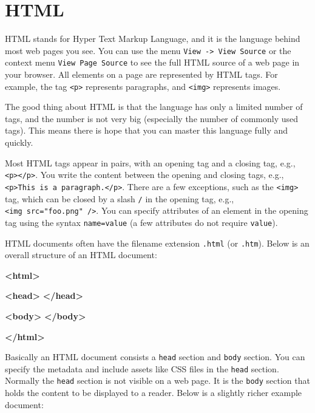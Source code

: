 \documentclass[12pt,]{krantz}
\makeatletter
\newenvironment{Shaded}{\begin{snugshade}}{\end{snugshade}}
\newcommand{\KeywordTok}[1]{\textcolor[rgb]{0.13,0.29,0.53}{\textbf{#1}}}
\newenvironment{kframe}{%
\medskip{}
\setlength{\fboxsep}{.8em}
 \def\at@end@of@kframe{}%
 \ifinner\ifhmode%
  \def\at@end@of@kframe{\end{minipage}}%
  \begin{minipage}{\columnwidth}%
 \fi\fi%
 \def\FrameCommand##1{\hskip\@totalleftmargin \hskip-\fboxsep
 \colorbox{shadecolor}{##1}\hskip-\fboxsep
     \hskip-\linewidth \hskip-\@totalleftmargin \hskip\columnwidth}%
 \MakeFramed {\advance\hsize-\width
   \@totalleftmargin\z@ \linewidth\hsize
   \@setminipage}}%
 {\par\unskip\endMakeFramed%
 \at@end@of@kframe}
\renewenvironment{Shaded}{\begin{kframe}}{\end{kframe}}
\theoremstyle{definition}
\theoremstyle{definition}
\theoremstyle{definition}
\theoremstyle{remark}
\makeatother
\begin{document}
\section{HTML}\label{html}

HTML stands for Hyper Text Markup Language, and it is the
language behind most web pages you see. You can use the menu
\texttt{View\ -\textgreater{}\ View\ Source} or the context menu
\texttt{View\ Page\ Source} to see the full HTML source of a web page in
your browser. All elements on a page are represented by HTML tags. For
example, the tag \texttt{\textless{}p\textgreater{}} represents
paragraphs, and \texttt{\textless{}img\textgreater{}} represents images.

The good thing about HTML is that the language has only a limited number
of tags, and the number is not very big (especially the number of
commonly used tags). This means there is hope that you can master this
language fully and quickly.

Most HTML tags appear in pairs, with an opening tag and a closing tag,
e.g., \texttt{\textless{}p\textgreater{}\textless{}/p\textgreater{}}.
You write the content between the opening and closing tags, e.g.,
\texttt{\textless{}p\textgreater{}This\ is\ a\ paragraph.\textless{}/p\textgreater{}}.
There are a few exceptions, such as the
\texttt{\textless{}img\textgreater{}} tag, which can be closed by a
slash \texttt{/} in the opening tag, e.g.,
\texttt{\textless{}img\ src="foo.png"\ /\textgreater{}}. You can specify
attributes of an element in the opening tag using the syntax
\texttt{name=value} (a few attributes do not require \texttt{value}).

HTML documents often have the filename extension \texttt{.html} (or
\texttt{.htm}). Below is an overall structure of an HTML document:

\begin{Shaded}
\begin{Highlighting}[]
\KeywordTok{<html>}

  \KeywordTok{<head>}
  \KeywordTok{</head>}
  
  \KeywordTok{<body>}
  \KeywordTok{</body>}

\KeywordTok{</html>}
\end{Highlighting}
\end{Shaded}

Basically an HTML document consists a \texttt{head} section and
\texttt{body} section. You can specify the metadata and include assets
like CSS files in the \texttt{head} section. Normally the \texttt{head}
section is not visible on a web page. It is the \texttt{body} section
that holds the content to be displayed to a reader. Below is a slightly
richer example document:
\end{document}
